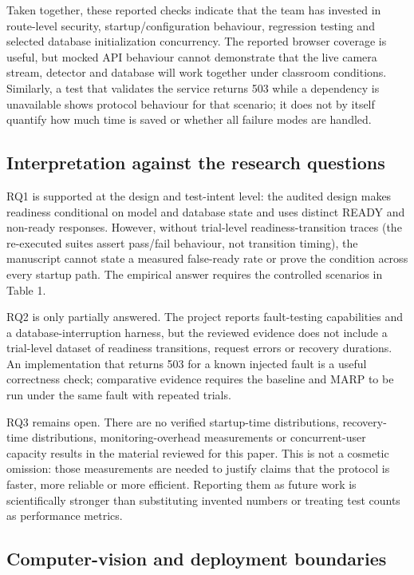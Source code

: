 \documentclass[11pt,a4paper]{article}
\begin{document}
Taken together, these reported checks indicate that the team has invested in route-level security, startup/configuration behaviour, regression testing and selected database initialization concurrency. The reported browser coverage is useful, but mocked API behaviour cannot demonstrate that the live camera stream, detector and database will work together under classroom conditions. Similarly, a test that validates the service returns 503 while a dependency is unavailable shows protocol behaviour for that scenario; it does not by itself quantify how much time is saved or whether all failure modes are handled.

\subsection{Interpretation against the research questions}

RQ1 is supported at the design and test-intent level: the audited design makes readiness conditional on model and database state and uses distinct READY and non-ready responses. However, without trial-level readiness-transition traces (the re-executed suites assert pass/fail behaviour, not transition timing), the manuscript cannot state a measured false-ready rate or prove the condition across every startup path. The empirical answer requires the controlled scenarios in Table 1.

RQ2 is only partially answered. The project reports fault-testing capabilities and a database-interruption harness, but the reviewed evidence does not include a trial-level dataset of readiness transitions, request errors or recovery durations. An implementation that returns 503 for a known injected fault is a useful correctness check; comparative evidence requires the baseline and MARP to be run under the same fault with repeated trials.

RQ3 remains open. There are no verified startup-time distributions, recovery-time distributions, monitoring-overhead measurements or concurrent-user capacity results in the material reviewed for this paper. This is not a cosmetic omission: those measurements are needed to justify claims that the protocol is faster, more reliable or more efficient. Reporting them as future work is scientifically stronger than substituting invented numbers or treating test counts as performance metrics.

\subsection{Computer-vision and deployment boundaries}
\end{document}
